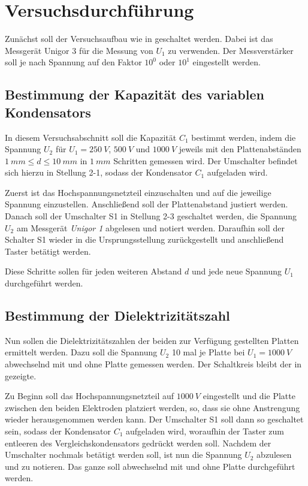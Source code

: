 \chapter{Versuchsdurchführung}
Zunächst soll der Versuchsaufbau wie in  geschaltet werden. Dabei ist das Messgerät Unigor 3 für die
Messung von $ U_{1} $ zu verwenden. Der Messverstärker soll je nach Spannung auf den Faktor $ 10^{0} $ oder $ 10^{1} $
eingestellt werden.
%
\section{Bestimmung der Kapazität des variablen Kondensators}
In diesem Versuchsabschnitt soll die Kapazität $ C_{1} $ bestimmt werden, indem die Spannung $ U_{2} $ für
\( U_{1}=\SI{250}{V}\), \(\SI{500}{V}\) und \(\SI{1000}{V}\) jeweils mit den Plattenabständen
$ \SI{1}{mm} \leq d \leq \SI{10}{mm} $ in $ \SI{1}{mm} $ Schritten gemessen wird. Der Umschalter befindet sich hierzu
in Stellung 2-1, sodass der Kondensator $ C_{1} $ aufgeladen wird.\par
Zuerst ist das Hochspannungsnetzteil einzuschalten und auf die jeweilige Spannung einzustellen. Anschließend soll der
Plattenabstand justiert werden. Danach soll der Umschalter S1 in Stellung 2-3 geschaltet werden, die Spannung $ U_{2} $
am Messgerät \textit{Unigor 1} abgelesen und notiert werden. Daraufhin soll der Schalter S1 wieder in die Ursprungsstellung
zurückgestellt und anschließend Taster betätigt werden.\par
Diese Schritte sollen für jeden weiteren Abstand \(d\) und jede neue Spannung \(U_1\) durchgeführt werden.\par
%
\section{Bestimmung der Dielektrizitätszahl}
Nun sollen die Dielektrizitätszahlen der beiden zur Verfügung gestellten Platten ermittelt werden. Dazu soll die Spannung
$ U_2 $ 10 mal je Platte bei $ U_1 = \SI{1000}{V} $ abwechselnd mit und ohne Platte gemessen werden. Der Schaltkreis
bleibt der in  gezeigte.\par
Zu Beginn soll das Hochspannungsnetzteil auf $ \SI{1000}{V} $ eingestellt und die Platte zwischen den beiden Elektroden platziert
werden, so, dass sie ohne Anstrengung wieder herausgenommen werden kann. Der Umschalter S1 soll dann so geschaltet sein,
sodass der Kondensator $ C_{1} $ aufgeladen wird, woraufhin der Taster zum entleeren des Vergleichskondensators gedrückt
werden soll. Nachdem der Umschalter nochmals betätigt werden soll, ist nun die Spannung $ U_{2} $ abzulesen und zu notieren.
Das ganze soll abwechselnd mit und ohne Platte durchgeführt werden.\par